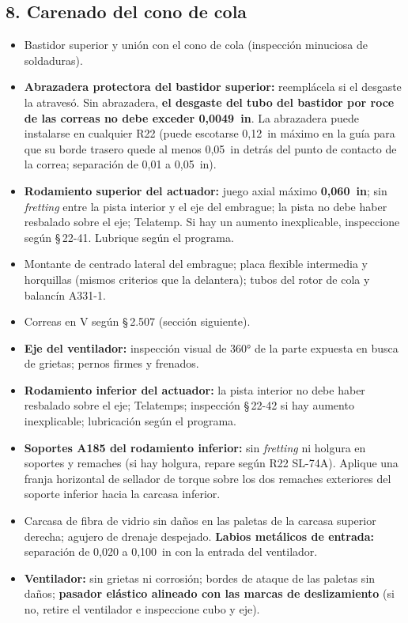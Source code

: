 \subsection*{8. Carenado del cono de cola}
\begin{itemize}
\item Bastidor superior y unión con el cono de cola (inspección minuciosa de soldaduras).
\item \textbf{Abrazadera protectora del bastidor superior:} reemplácela si el desgaste la atravesó. Sin abrazadera, \textbf{el desgaste del tubo del bastidor por roce de las correas no debe exceder 0,0049~in}. La abrazadera puede instalarse en cualquier R22 (puede escotarse 0,12~in máximo en la guía para que su borde trasero quede al menos 0,05~in detrás del punto de contacto de la correa; separación de 0,01 a 0,05~in).
\item \textbf{Rodamiento superior del actuador:} juego axial máximo \textbf{0,060~in}; sin \emph{fretting} entre la pista interior y el eje del embrague; la pista no debe haber resbalado sobre el eje; Telatemp. Si hay un aumento inexplicable, inspeccione según \S\,22-41. Lubrique según el programa.
\item Montante de centrado lateral del embrague; placa flexible intermedia y horquillas (mismos criterios que la delantera); tubos del rotor de cola y balancín A331-1.
\item Correas en V según \S\,2.507 (sección siguiente).
\item \textbf{Eje del ventilador:} inspección visual de 360° de la parte expuesta en busca de grietas; pernos firmes y frenados.
\item \textbf{Rodamiento inferior del actuador:} la pista interior no debe haber resbalado sobre el eje; Telatemps; inspección \S\,22-42 si hay aumento inexplicable; lubricación según el programa.
\item \textbf{Soportes A185 del rodamiento inferior:} sin \emph{fretting} ni holgura en soportes y remaches (si hay holgura, repare según R22 SL-74A). Aplique una franja horizontal de sellador de torque sobre los dos remaches exteriores del soporte inferior hacia la carcasa inferior.
\item Carcasa de fibra de vidrio sin daños en las paletas de la carcasa superior derecha; agujero de drenaje despejado. \textbf{Labios metálicos de entrada:} separación de 0,020 a 0,100~in con la entrada del ventilador.
\item \textbf{Ventilador:} sin grietas ni corrosión; bordes de ataque de las paletas sin daños; \textbf{pasador elástico alineado con las marcas de deslizamiento} (si no, retire el ventilador e inspeccione cubo y eje).

\end{itemize}
